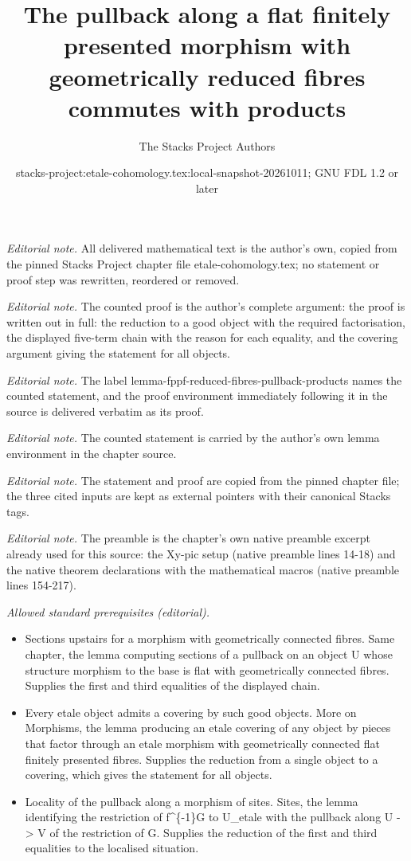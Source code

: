 \documentclass[10pt,a4paper]{amsart}
\title{The pullback along a flat finitely presented morphism with geometrically reduced fibres commutes with products}
\author{The Stacks Project Authors}
\date{stacks-project:etale-cohomology.tex:local-snapshot-20261011; GNU FDL 1.2 or later}
\theoremstyle{plain}
\theoremstyle{definition}
\theoremstyle{remark}
\numberwithin{equation}{subsection}
\begin{document}
\maketitle
\noindent\textit{Editorial note.} All delivered mathematical text is the author's own, copied from the pinned Stacks Project chapter file etale-cohomology.tex; no statement or proof step was rewritten, reordered or removed.\par\medskip
\noindent\textit{Editorial note.} The counted proof is the author's complete argument: the proof is written out in full: the reduction to a good object with the required factorisation, the displayed five-term chain with the reason for each equality, and the covering argument giving the statement for all objects.\par\medskip
\noindent\textit{Editorial note.} The label lemma-fppf-reduced-fibres-pullback-products names the counted statement, and the proof environment immediately following it in the source is delivered verbatim as its proof.\par\medskip
\noindent\textit{Editorial note.} The counted statement is carried by the author's own lemma environment in the chapter source.\par\medskip
\noindent\textit{Editorial note.} The statement and proof are copied from the pinned chapter file; the three cited inputs are kept as external pointers with their canonical Stacks tags.\par\medskip
\noindent\textit{Editorial note.} The preamble is the chapter's own native preamble excerpt already used for this source: the Xy-pic setup (native preamble lines 14-18) and the native theorem declarations with the mathematical macros (native preamble lines 154-217).\par\medskip
\noindent\textit{Allowed standard prerequisites (editorial).}\begin{itemize}
\item Sections upstairs for a morphism with geometrically connected fibres. Same chapter, the lemma computing sections of a pullback on an object U whose structure morphism to the base is flat with geometrically connected fibres. Supplies the first and third equalities of the displayed chain.
\item Every etale object admits a covering by such good objects. More on Morphisms, the lemma producing an etale covering of any object by pieces that factor through an etale morphism with geometrically connected flat finitely presented fibres. Supplies the reduction from a single object to a covering, which gives the statement for all objects.
\item Locality of the pullback along a morphism of sites. Sites, the lemma identifying the restriction of f\textasciicircum{}\{-1\}G to U\_etale with the pullback along U -> V of the restriction of G. Supplies the reduction of the first and third equalities to the localised situation.
\end{itemize}\medskip
\end{document}
